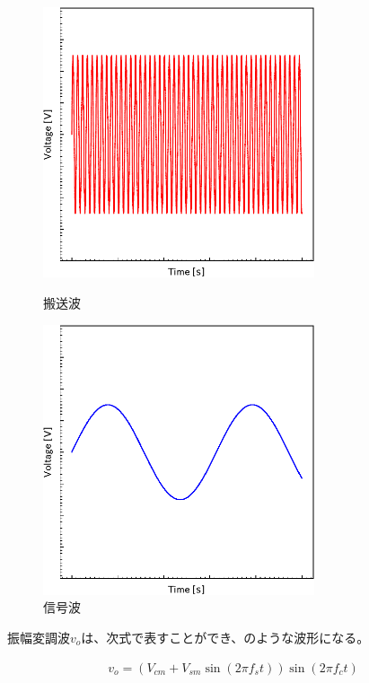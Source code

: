 \documentclass[report.tex]{subfiles}
\begin{document}
\begin{figure}[H]
	\begin{minipage}[b]{0.5\columnwidth}
		\centering
		\includegraphics[width=8cm]{fig/5V.pdf}
		\caption{搬送波}
		\label{fig:5V}
	\end{minipage}
	\begin{minipage}[b]{0.5\columnwidth}
		\centering
		\includegraphics[width=8cm]{fig/3V.pdf}
		\caption{信号波}
		\label{fig:3V}
	\end{minipage}
\end{figure}

振幅変調波\(v_o\)は、次式で表すことができ、のような波形になる。

\begin{align}
	v_o = (V_{cm} + V_{sm} \sin(2 \pi f_s t)) \sin(2 \pi f_c t)
\end{align}
\end{document}
